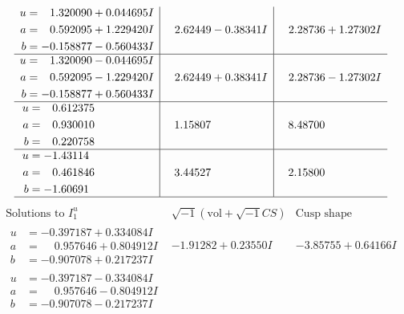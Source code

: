 \documentclass[1p]{elsarticle_modified}
\theoremstyle{definition}
\newcommand{\I}{\sqrt{-1}}
\begin{document}
$$\begin{array}{c|c|c}
\begin{aligned}
u &= \phantom{-}1.320090 + 0.044695 I \\
a &= \phantom{-}0.592095 + 1.229420 I \\
b &= -0.158877 - 0.560433 I\end{aligned}
 & \phantom{-}2.62449 - 0.38341 I & \phantom{-}2.28736 + 1.27302 I \\ \hline\begin{aligned}
u &= \phantom{-}1.320090 - 0.044695 I \\
a &= \phantom{-}0.592095 - 1.229420 I \\
b &= -0.158877 + 0.560433 I\end{aligned}
 & \phantom{-}2.62449 + 0.38341 I & \phantom{-}2.28736 - 1.27302 I \\ \hline\begin{aligned}
u &= \phantom{-}0.612375\phantom{ +0.000000I} \\
a &= \phantom{-}0.930010\phantom{ +0.000000I} \\
b &= \phantom{-}0.220758\phantom{ +0.000000I}\end{aligned}
 & \phantom{-}1.15807\phantom{ +0.000000I} & \phantom{-}8.48700\phantom{ +0.000000I} \\ \hline\begin{aligned}
u &= -1.43114\phantom{ +0.000000I} \\
a &= \phantom{-}0.461846\phantom{ +0.000000I} \\
b &= -1.60691\phantom{ +0.000000I}\end{aligned}
 & \phantom{-}3.44527\phantom{ +0.000000I} & \phantom{-}2.15800\phantom{ +0.000000I}\\
 \hline 
 \end{array}$$\newpage$$\begin{array}{c|c|c}  
\text{Solutions to }I^u_{1}& \I (\text{vol} + \sqrt{-1}CS) & \text{Cusp shape}\\
 \hline 
\begin{aligned}
u &= -0.397187 + 0.334084 I \\
a &= \phantom{-}0.957646 + 0.804912 I \\
b &= -0.907078 + 0.217237 I\end{aligned}
 & -1.91282 + 0.23550 I & -3.85755 + 0.64166 I \\ \hline\begin{aligned}
u &= -0.397187 - 0.334084 I \\
a &= \phantom{-}0.957646 - 0.804912 I \\
b &= -0.907078 - 0.217237 I\end{aligned}

\end{array}$$
\end{document}
